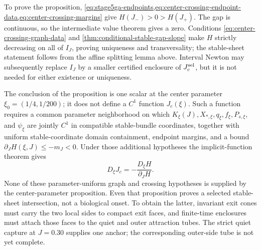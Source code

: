 To prove the proposition,
\cref{eq:stage5ga-endpoints,eq:center-crossing-endpoint-data,eq:center-crossing-margins}
give
\(H(J_-)>0>H(J_+)\).  The gap is continuous,
so the intermediate value theorem gives a zero.  Conditions
\cref{eq:center-crossing-graph-data} and
\cref{thm:conditional-stable-gap-slope} make \(H\) strictly decreasing on
all of \(I_J\), proving uniqueness and transversality; the stable-sheet
statement follows from the affine splitting lemma above.  Interval Newton
may subsequently replace \(I_J\) by a smaller certified enclosure of
\(J_c^{\rm sel}\), but it is not needed for either existence or uniqueness.

The conclusion of the proposition is one scalar at the center parameter
\(\xi_0=(1/4,1/200)\); it does not define a \(C^1\) function
\(J_c(\xi)\).  Such a function requires a common parameter neighborhood on
which \(K_\xi(J),X_{*,\xi},q_\xi,f_\xi,P_{s,\xi}\), and \(\psi_\xi\) are jointly
\(C^1\) in compatible stable-bundle coordinates, together with uniform
stable-coordinate domain containment, endpoint margins, and a bound
\(\partial_JH(\xi,J)\le-m_J<0\).  Under those additional hypotheses the
implicit-function theorem gives
\begin{equation}
 D_\xi J_c=-\frac{D_\xi H}{\partial_JH}.               \label{eq:Jc-derivative}
\end{equation}
None of these parameter-uniform graph and crossing hypotheses is supplied by
the center-parameter proposition.  Even that proposition proves a selected
stable-sheet intersection, not a biological onset.
To obtain the latter, invariant exit cones must carry the two local sides to
compact exit faces, and finite-time enclosures must attach those faces to the
quiet and outer attraction tubes.  The strict quiet capture at \(J=0.30\)
supplies one anchor; the corresponding outer-side tube is not yet complete.



